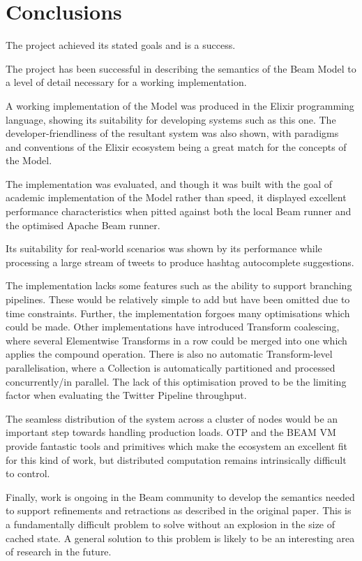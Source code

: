 \chapter{Conclusions}\label{ch:concl}

The project achieved its stated goals and is a success.

The project has been successful in describing the semantics of the Beam Model to a level of detail necessary for a working implementation.

A working implementation of the Model was produced in the Elixir programming language, showing its suitability for developing systems such as this one.
The developer-friendliness of the resultant system was also shown, with paradigms and conventions of the Elixir ecosystem being a great match for the concepts of the Model.

The implementation was evaluated, and though it was built with the goal of academic implementation of the Model rather than speed, it displayed excellent performance characteristics when pitted against both the local Beam runner and the optimised Apache Beam runner.

Its suitability for real-world scenarios was shown by its performance while processing a large stream of tweets to produce hashtag autocomplete suggestions.

The implementation lacks some features such as the ability to support branching pipelines.
These would be relatively simple to add but have been omitted due to time constraints.
Further, the implementation forgoes many optimisations which could be made.
Other implementations have introduced Transform coalescing, where several Elementwise Transforms in a row could be merged into one which applies the compound operation.
There is also no automatic Transform-level parallelisation, where a Collection is automatically partitioned and processed concurrently/in parallel.
The lack of this optimisation proved to be the limiting factor when evaluating the Twitter Pipeline throughput.

The seamless distribution of the system across a cluster of nodes would be an important step towards handling production loads.
OTP and the BEAM VM provide fantastic tools and primitives which make the ecosystem an excellent fit for this kind of work, but distributed computation remains intrinsically difficult to control.

Finally, work is ongoing in the Beam community \cite{JIRA-retractions} to develop the semantics needed to support refinements and retractions as described in the original paper.
This is a fundamentally difficult problem to solve without an explosion in the size of cached state.
A general solution to this problem is likely to be an interesting area of research in the future.